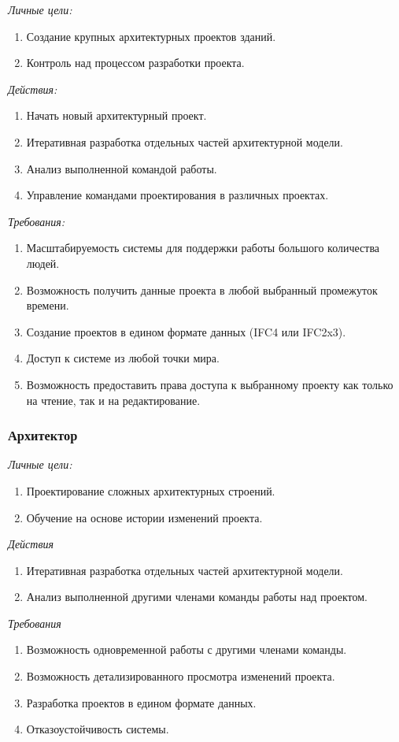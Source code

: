 \documentclass[a4paper,14pt]{extreport} %
\begin{document}
\textit{Личные цели:}
\begin{enumerate}
\item Создание крупных архитектурных проектов зданий.
\item Контроль над процессом разработки проекта.
\end{enumerate}
\textit{Действия:}
\begin{enumerate}
\item Начать новый архитектурный проект.
\item Итеративная разработка отдельных частей архитектурной модели.
\item Анализ выполненной командой работы.
\item Управление командами проектирования в различных проектах.
\end{enumerate}
\textit{Требования:}
\begin{enumerate}
\item Масштабируемость системы для поддержки работы большого количества людей.
\item Возможность получить данные проекта в любой выбранный промежуток времени.
\item Создание проектов в едином формате данных (IFC4 или IFC2x3).
\item Доступ к системе из любой точки мира.
\item Возможность предоставить права доступа к выбранному проекту как только на чтение, так и на редактирование.
\end{enumerate}

\subsubsection{Архитектор}

\textit{Личные цели:}
\begin{enumerate}
\item Проектирование сложных архитектурных строений.
\item Обучение на основе истории изменений проекта.
\end{enumerate}
\textit{Действия}
\begin{enumerate}
\item Итеративная разработка отдельных частей архитектурной модели.
\item Анализ выполненной другими членами команды работы над проектом.
\end{enumerate}
\textit{Требования}
\begin{enumerate}
\item Возможность одновременной работы с другими членами команды.
\item Возможность детализированного просмотра изменений проекта.
\item Разработка проектов в едином формате данных.
\item Отказоустойчивость системы.
\end{enumerate}
\end{document}
